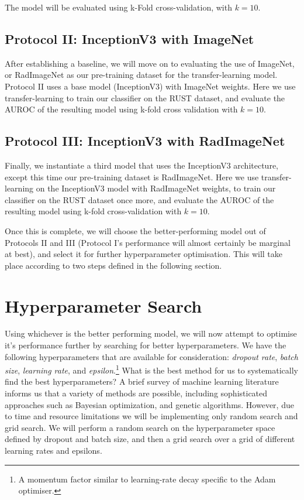 \noindent
The model will be evaluated using k-Fold cross-validation, with $k=10$.

\subsection{Protocol II: InceptionV3 with ImageNet}\label{sec:protocol-ii-method}

After establishing a baseline, we will move on to evaluating the use of ImageNet, or RadImageNet as our pre-training dataset for the transfer-learning model. Protocol II uses a base model (InceptionV3) with ImageNet weights. Here we use transfer-learning to train our classifier on the RUST dataset, and evaluate the AUROC of the resulting model using k-fold cross validation with \(k=10\).

\subsection{Protocol III: InceptionV3 with RadImageNet}\label{sec:protocol-iii-method}

Finally, we instantiate a third model that uses the InceptionV3 architecture, except this time our pre-training dataset is RadImageNet. Here we use transfer-learning on the InceptionV3 model with RadImageNet weights, to train our classifier on the RUST dataset once more, and evaluate the AUROC of the resulting model using k-fold cross-validation with \(k=10\).

Once this is complete, we will choose the better-performing model out of Protocols II and III (Protocol I's performance will almost certainly be marginal at best), and select it for further hyperparameter optimisation. This will take place according to two steps defined in the following section.

\section{Hyperparameter Search}\label{sec:hypersearch}

Using whichever is the better performing model, we will now attempt to optimise it's performance further by searching for better hyperparameters. We have the following hyperparameters that are available for consideration: \emph{dropout rate}, \emph{batch size}, \emph{learning rate}, and \emph{epsilon}.\footnote{A momentum factor similar to learning-rate decay specific to the Adam optimiser.} What is the best method for us to systematically find the best hyperparameters? A brief survey of machine learning literature informs us that a variety of methods are possible, including sophisticated approaches such as Bayesian optimization, and genetic algorithms. \autocite{yang2020} However, due to time and resource limitations we will be implementing only random search and grid search. We will perform a random search on the hyperparameter space defined by dropout and batch size, and then a grid search over a grid of different learning rates and epsilons.

